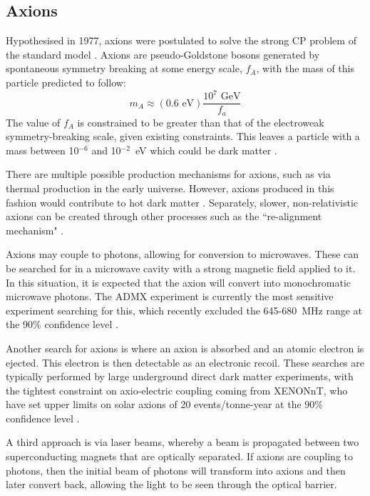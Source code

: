 \subsection{Axions}
\par
Hypothesised in 1977, axions were postulated to solve the strong CP problem of the standard model \cite{axion_origins_ref}.
Axions are pseudo-Goldstone bosons generated by spontaneous symmetry breaking at some energy scale, $f_A$, with the mass of this particle predicted to follow:
\begin{equation}
    m_A \approx (0.6 \text{ eV})\frac{10^7 \text{ GeV}}{f_a}
\end{equation}
The value of $f_A$ is constrained to be greater than that of the electroweak symmetry-breaking scale, given existing constraints.
This leaves a particle with a mass between 10${}^{-6}$ and 10${}^{-2}$~eV which could be dark matter \cite{axions_ref}.
\par
There are multiple possible production mechanisms for axions, such as via thermal production in the early universe.
However, axions produced in this fashion would contribute to hot dark matter \cite{hot_axions_ref}.
Separately, slower, non-relativistic axions can be created through other processes such as the ``re-alignment mechanism" \cite{cold_axion_ref}.
\par
Axions may couple to photons, allowing for conversion to microwaves.
These can be searched for in a microwave cavity with a strong magnetic field applied to it.
In this situation, it is expected that the axion will convert into monochromatic microwave photons.
The ADMX experiment is currently the most sensitive experiment searching for this, which recently excluded the 645-680~MHz range at the 90\% confidence level \cite{admx_experiment_ref}.
\par
Another search for axions is where an axion is absorbed and an atomic electron is ejected.
This electron is then detectable as an electronic recoil.
These searches are typically performed by large underground direct dark matter experiments, with the tightest constraint on axio-electric coupling coming from XENONnT, who have set upper limits on solar axions of 20 events/tonne-year at the 90\% confidence level \cite{xenonnt_sr1_er_ref}.
\par
A third approach is via laser beams, whereby a beam is propagated between two superconducting magnets that are optically separated.
If axions are coupling to photons, then the initial beam of photons will transform into axions and then later convert back, allowing the light to be seen through the optical barrier.
